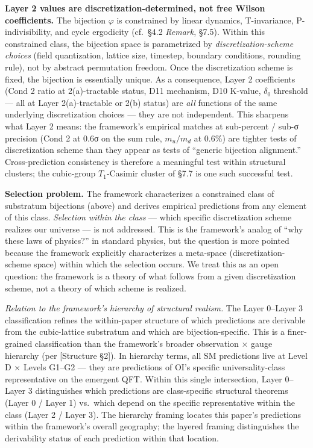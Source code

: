 \documentclass[
]{article}
\begin{document}
\textbf{Layer 2 values are discretization-determined, not free Wilson
coefficients.} The bijection \(\varphi\) is constrained by linear
dynamics, T-invariance, P-indivisibility, and cycle ergodicity (cf.~§4.2
\emph{Remark}, §7.5). Within this constrained class, the bijection space
is parametrized by \emph{discretization-scheme choices} (field
quantization, lattice size, timestep, boundary conditions, rounding
rule), not by abstract permutation freedom. Once the discretization
scheme is fixed, the bijection is essentially unique. As a consequence,
Layer 2 coefficients (Cond 2 ratio at 2(a)-tractable status, D11
mechanism, D10 K-value, \(\delta_0\) threshold --- all at Layer
2(a)-tractable or 2(b) status) are \emph{all} functions of the same
underlying discretization choices --- they are not independent. This
sharpens what Layer 2 means: the framework's empirical matches at
sub-percent / sub-σ precision (Cond 2 at 0.6σ on the sum rule,
\(m_u/m_d\) at 0.6\%) are tighter tests of discretization scheme than
they appear as tests of ``generic bijection alignment.''
Cross-prediction consistency is therefore a meaningful test within
structural clusters; the cubic-group \(T_1\)-Casimir cluster of §7.7 is
one such successful test.

\textbf{Selection problem.} The framework characterizes a constrained
class of substratum bijections (above) and derives empirical predictions
from any element of this class. \emph{Selection within the class} ---
which specific discretization scheme realizes our universe --- is not
addressed. This is the framework's analog of ``why these laws of
physics?'' in standard physics, but the question is more pointed because
the framework explicitly characterizes a meta-space
(discretization-scheme space) within which the selection occurs. We
treat this as an open question: the framework is a theory of what
follows from a given discretization scheme, not a theory of which scheme
is realized.

\emph{Relation to the framework's hierarchy of structural realism.} The
Layer 0--Layer 3 classification refines the within-paper structure of
which predictions are derivable from the cubic-lattice substratum and
which are bijection-specific. This is a finer-grained classification
than the framework's broader observation × gauge hierarchy (per
{[}Structure §2{]}). In hierarchy terms, all SM predictions live at
Level D × Levels G1--G2 --- they are predictions of OI's specific
universality-class representative on the emergent QFT. Within this
single intersection, Layer 0--Layer 3 distinguishes which predictions
are class-specific structural theorems (Layer 0 / Layer 1) vs.~which
depend on the specific representative within the class (Layer 2 / Layer
3). The hierarchy framing locates this paper's predictions within the
framework's overall geography; the layered framing distinguishes the
derivability status of each prediction within that location.
\end{document}
